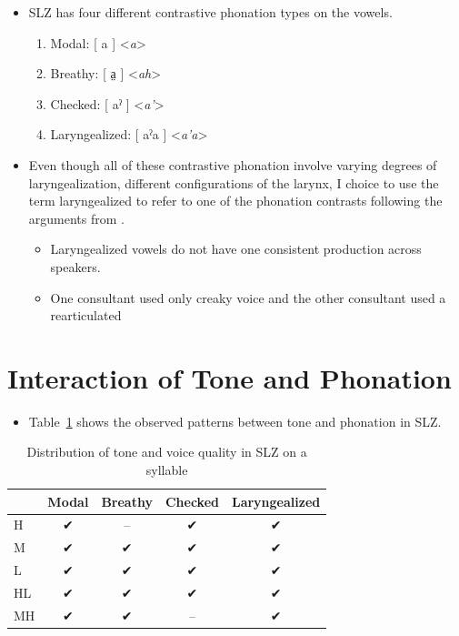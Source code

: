 \documentclass[12pt, letterpaper]{article}
\providecommand{\lsptoprule}{\midrule\toprule}
\providecommand{\lspbottomrule}{\bottomrule\midrule}
\begin{document}
\begin{itemize}
	\item SLZ has four different contrastive phonation types on the vowels. 
	\begin{enumerate}
		\item Modal: [ a ] <\textit{a}>
		\item Breathy: [ a̤ ] <\textit{ah}> 
		\item Checked: [ aˀ ] <\textit{a'}> 
		\item Laryngealized: [ aˀa ] <\textit{a'a}> 
	\end{enumerate}
	\item Even though all of these contrastive phonation involve varying degrees of laryngealization, different configurations of the larynx, I choice to use the term laryngealized to refer to one of the phonation contrasts following the arguments from \citet{avelinoAcousticElectroglottographicAnalyses2010}.
	\begin{itemize}
		\item Laryngealized vowels do not have one consistent production across speakers. 
		\item One consultant used only creaky voice and the other consultant used a rearticulated 
	\end{itemize}
\end{itemize}

\section{Interaction of Tone and Phonation} \label{sec:Interaction}

\begin{itemize}
	\item Table~\ref{tab:ToneVoiceQuality} shows the observed patterns between tone and phonation in SLZ. 
\end{itemize}

\vspace{-20pt}
\begin{table}[!h]
	\caption{Distribution of tone and voice quality in SLZ on a syllable}
	\label{tab:ToneVoiceQuality}
	\centering

	\begin{tabular}{lcccc}
	\lsptoprule
		& \textbf{Modal} & \textbf{Breathy} & \textbf{Checked} & \textbf{Laryngealized} \\
	\hline
	H	& ✔ & -- & ✔ & ✔ \\
	M	& ✔ & ✔ & ✔ & ✔\\
	L	& ✔	& ✔ & ✔ & ✔\\
	HL	& ✔	& ✔ & ✔ & ✔\\
	MH	& ✔	& ✔ & -- & ✔ \\
	\lspbottomrule
	\end{tabular}
\end{table}
\end{document}
